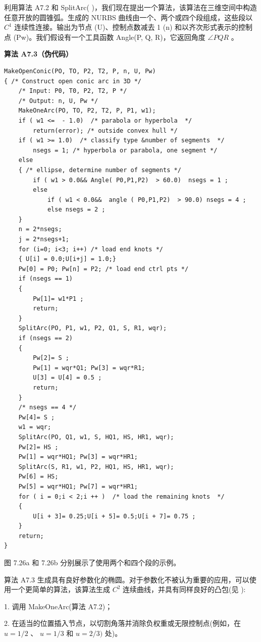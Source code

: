 \documentclass[../main.tex]{subfiles}
\begin{document}
利用算法 A7.2 和 SplitArc(   )，我们现在提出一个算法，该算法在三维空间中构造任意开放的圆锥弧。生成的 NURBS 曲线由一个、两个或四个段组成，这些段以 \({C}^{1}\) 连续性连接。输出为节点 (U)、控制点数减去 1 (n) 和以齐次形式表示的控制点 (Pw)。我们假设有一个工具函数 Angle(P, Q, R)，它返回角度 \(\angle {PQR}\) 。

\par\medskip\noindent\textbf{算法 A7.3（伪代码）}\par
\begin{verbatim}
MakeOpenConic(PO, TO, P2, T2, P, n, U, Pw)
{ /* Construct open conic arc in 3D */
    /* Input: P0, T0, P2, T2, P */
    /* Output: n, U, Pw */
    MakeOneArc(PO, TO, P2, T2, P, P1, w1);
    if ( w1 <=  - 1.0)  /* parabola or hyperbola  */
        return(error); /* outside convex hull */
    if ( w1 >= 1.0)  /* classify type &number of segments  */
        nsegs = 1; /* hyperbola or parabola, one segment */
    else
    { /* ellipse, determine number of segments */
        if ( w1 > 0.0&& Angle( P0,P1,P2)  > 60.0)  nsegs = 1 ;
        else
            if ( w1 < 0.0&&  angle ( P0,P1,P2)  > 90.0) nsegs = 4 ;
            else nsegs = 2 ;
    }
    n = 2*nsegs;
    j = 2*nsegs+1;
    for (i=0; i<3; i++) /* load end knots */
    { U[i] = 0.0;U[i+j] = 1.0;}
    Pw[0] = P0; Pw[n] = P2; /* load end ctrl pts */
    if (nsegs == 1)
    {
        Pw[1]= w1*P1 ;
        return;
    }
    SplitArc(PO, P1, w1, P2, Q1, S, R1, wqr);
    if (nsegs == 2)
    {
        Pw[2]= S ;
        Pw[1] = wqr*Q1; Pw[3] = wqr*R1;
        U[3] = U[4] = 0.5 ;
        return;
    }
    /* nsegs == 4 */
    Pw[4]= S ;
    w1 = wqr;
    SplitArc(PO, Q1, w1, S, HQ1, HS, HR1, wqr);
    Pw[2]= HS ;
    Pw[1] = wqr*HQ1; Pw[3] = wqr*HR1;
    SplitArc(S, R1, w1, P2, HQ1, HS, HR1, wqr);
    Pw[6] = HS;
    Pw[5] = wqr*HQ1; Pw[7] = wqr*HR1;
    for ( i = 0;i < 2;i ++ )  /* load the remaining knots  */
    {
        U[i + 3]= 0.25;U[i + 5]= 0.5;U[i + 7]= 0.75 ;
    }
    return;
}
\end{verbatim}

图 7.26a 和 7.26b 分别展示了使用两个和四个段的示例。

算法 A7.3 生成具有良好参数化的椭圆。对于参数化不被认为重要的应用，可以使用一个更简单的算法，该算法生成 \({C}^{2}\) 连续曲线，并具有同样良好的凸包(见 \cite{Pieg90}):

1. 调用 MakeOneArc(算法 A7.2)；

2. 在适当的位置插入节点，以切割角落并消除负权重或无限控制点(例如，在 \(u = 1/2\) 、 \(u = 1/3\) 和 \(u = 2/3)\) 处)。
\end{document}
